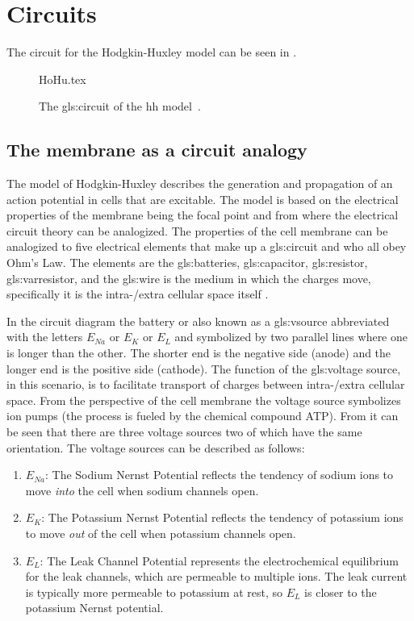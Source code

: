 \documentclass[class={myRUCProject}, crop=false]{standalone}
\begin{document}
 
 

\section{Circuits}
The circuit for the Hodgkin-Huxley model can be seen in . 

\begin{figure}[ht]
    \centering
    {HoHu.tex}
    \caption{The \gls{gls:circuit} of the \gls{hh} model~\cite{HodHux1952}.}\label{fig:HHcircuit}
\end{figure}

\subsection*{The membrane as a circuit analogy}
The model of Hodgkin-Huxley describes the generation and propagation of an action potential in cells that are excitable. The model is based on the electrical properties of the membrane being the focal point and from where the electrical circuit theory can be analogized.
The properties of the cell membrane can be analogized to five electrical elements that make up a \gls{gls:circuit} and who all obey Ohm's Law. The elements are the \gls{gls:batteries}, \gls{gls:capacitor}, \gls{gls:resistor}, \gls{gls:varresistor}, and the \gls{gls:wire} is the medium in which the charges move, specifically it is the intra-/extra cellular space itself .

In the circuit diagram the battery or also known as a \gls{gls:vsource} abbreviated with the letters $E_{Na}$ or $E_K$ or $E_L$ and symbolized by two parallel lines where one is longer than the other. The shorter end is the negative side (anode) and the longer end is the positive side (cathode). The function of the \gls{gls:voltage} source, in this scenario, is to facilitate transport of charges between intra-/extra cellular space. From the perspective of the cell membrane the voltage source symbolizes ion pumps (the process is fueled by the chemical compound ATP). From  it can be seen that there are three voltage sources two of which have the same orientation. The voltage sources can be described as follows:

\begin{enumerate}
    \item $E_{Na}$: The Sodium Nernst Potential reflects the tendency of sodium ions to move \textit{into} the cell when sodium channels open.
    \item $E_K$: The Potassium Nernst Potential reflects the tendency of potassium ions to move \textit{out} of the cell when potassium channels open.
    \item $E_{L}$: The Leak Channel Potential represents the electrochemical equilibrium for the leak channels, which are permeable to multiple ions. The leak current is typically more permeable to potassium at rest, so $E_L$ is closer to the potassium Nernst potential.
\end{enumerate}
\end{document}
